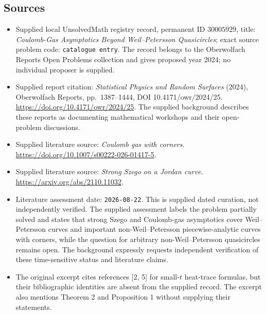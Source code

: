 \documentclass[11pt]{article}
\begin{document}
\subsection{Sources}
\begin{itemize}
\item Supplied local UnsolvedMath registry record, permanent ID \(30005929\), title: \emph{Coulomb-Gas Asymptotics Beyond Weil--Petersson Quasicircles}; exact source problem code: \texttt{catalogue entry}. The record belongs to the Oberwolfach Reports Open Problems collection and gives proposed year 2024; no individual proposer is supplied.
\item Supplied report citation: \emph{Statistical Physics and Random Surfaces} (2024), Oberwolfach Reports, pp.\ 1387--1444, DOI 10.4171/owr/2024/25. \url{https://doi.org/10.4171/owr/2024/25}. The supplied background describes these reports as documenting mathematical workshops and their open-problem discussions.
\item Supplied literature source: \emph{Coulomb gas with corners}. \url{https://doi.org/10.1007/s00222-026-01417-5}.
\item Supplied literature source: \emph{Strong Szego on a Jordan curve}. \url{https://arxiv.org/abs/2110.11032}.
\item Literature assessment date: \texttt{2026-08-22}. This is supplied dated curation, not independently verified. The supplied assessment labels the problem partially solved and states that strong Szego and Coulomb-gas asymptotics cover Weil--Petersson curves and important non-Weil--Petersson piecewise-analytic curves with corners, while the question for arbitrary non-Weil--Petersson quasicircles remains open. The background expressly requests independent verification of these time-sensitive status and literature claims.
\item The original excerpt cites references [2, 5] for small-\(t\) heat-trace formulas, but their bibliographic identities are absent from the supplied record. The excerpt also mentions Theorem 2 and Proposition 1 without supplying their statements.
\end{itemize}
\end{document}
